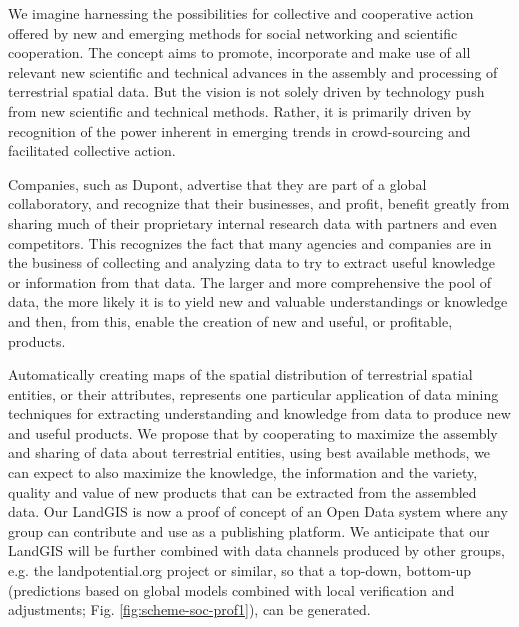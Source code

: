 \documentclass[graybox,natbib,nospthms,UStrade]{svmono}
\begin{document}
We imagine harnessing the possibilities for collective and cooperative
action offered by new and emerging methods for social networking and
scientific cooperation. The concept aims to promote, incorporate and
make use of all relevant new scientific and technical advances in the
assembly and processing of terrestrial spatial data. But the vision is
not solely driven by technology push from new scientific and technical
methods. Rather, it is primarily driven by recognition of the power
inherent in emerging trends in crowd-sourcing and facilitated collective
action.

Companies, such as Dupont, advertise that they are part of a global
collaboratory, and recognize that their businesses, and profit, benefit
greatly from sharing much of their proprietary internal research data
with partners and even competitors. This recognizes the fact that many
agencies and companies are in the business of collecting and analyzing
data to try to extract useful knowledge or information from that data.
The larger and more comprehensive the pool of data, the more likely it
is to yield new and valuable understandings or knowledge and then, from
this, enable the creation of new and useful, or profitable, products.

Automatically creating maps of the spatial distribution of terrestrial
spatial entities, or their attributes, represents one particular
application of data mining techniques for extracting understanding and
knowledge from data to produce new and useful products. We propose that
by cooperating to maximize the assembly and sharing of data about
terrestrial entities, using best available methods, we can expect to
also maximize the knowledge, the information and the variety, quality
and value of new products that can be extracted from the assembled data.
Our LandGIS is now a proof of concept of an Open Data system where any group
can contribute and use as a publishing platform. We anticipate that our LandGIS
will be further combined with data channels produced by other groups, e.g.
the landpotential.org project or similar, so that a top-down, bottom-up
(predictions based on global models combined with local
verification and adjustments; Fig. \ref{fig:scheme-soc-prof1}), can be
generated.
\end{document}
